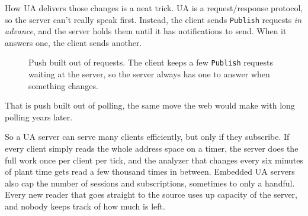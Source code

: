 How UA delivers those changes is a neat trick. UA is a request/response
protocol, so the server can't really speak first. Instead, the client sends
\texttt{Publish} requests \emph{in advance}, and the server holds them until it
has notifications to send. When it answers one, the client sends another.

\begin{figure}[htbp]
\centering
{}
\caption{Push built out of requests. The client keeps a few \texttt{Publish}
requests waiting at the server, so the server always has one to answer when
something changes.}
\end{figure}

That is push built out of polling, the same move the web would make with long
polling years later.

So a UA server can serve many clients efficiently, but only if they subscribe.
If every client simply reads the whole address space on a timer, the server does
the full work once per client per tick, and the analyzer that changes every six
minutes of plant time gets read a few thousand times in between. Embedded UA
servers also cap the number of sessions and subscriptions, sometimes to only a
handful. Every new reader that goes straight to the source uses up capacity of the
server, and nobody keeps track of how much is left.

